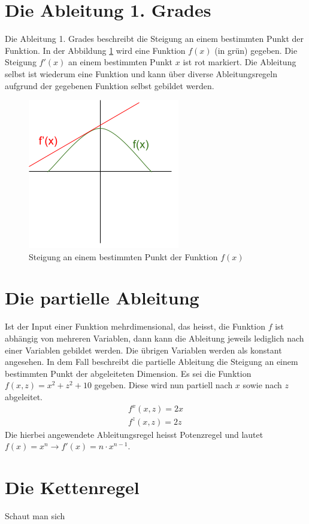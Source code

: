 \section{Die Ableitung 1. Grades}
Die Ableitung 1. Grades beschreibt die Steigung an einem bestimmten Punkt der Funktion. In der Abbildung \ref{fig:00_steigung_an_punkt}
wird eine Funktion $f(x)$ (in grün) gegeben. Die Steigung $f'(x)$ an einem bestimmten Punkt $x$ ist rot markiert.
Die Ableitung selbst ist wiederum eine Funktion und kann über diverse Ableitungsregeln aufgrund der gegebenen Funktion
selbst gebildet werden.
\begin{figure}[h!]
    \begin{center}
        \includegraphics[width=0.4\linewidth]{../common/02_appendix/00_resources/00_derivation.png}
    \end{center}
    \caption{Steigung an einem bestimmten Punkt der Funktion $f(x)$}
    \label{fig:00_steigung_an_punkt}
\end{figure}

\section{Die partielle Ableitung}
Ist der Input einer Funktion mehrdimensional, das heisst, die Funktion $f$ ist abhängig von mehreren Variablen, dann
kann die Ableitung jeweils lediglich nach einer Variablen gebildet werden. Die übrigen Variablen werden als konstant
angesehen. In dem Fall beschreibt die partielle Ableitung die Steigung an einem bestimmten Punkt der abgeleiteten
Dimension. Es sei die Funktion $f(x, z) = x^2 + z^2 + 10$ gegeben. Diese wird nun partiell nach $x$ sowie
nach $z$ abgeleitet.
\begin{align}
    f^x(x, z) = 2x\\
    f^z(x, z) = 2z
\end{align}
Die hierbei angewendete Ableitungsregel heisst Potenzregel und lautet\\$f(x) = x^n \longrightarrow f'(x) = n \cdot x^{n-1}$.

\section{Die Kettenregel}
Schaut man sich
